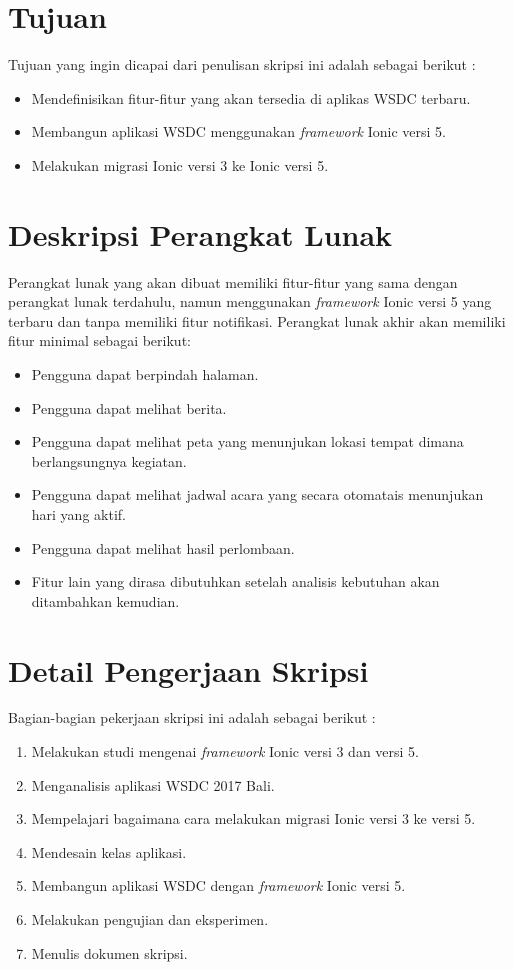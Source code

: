\documentclass[a4paper,twoside]{article}
\begin{document}
\section{Tujuan}
Tujuan yang ingin dicapai dari penulisan skripsi ini adalah sebagai berikut :
\begin{itemize}
	\item Mendefinisikan fitur-fitur yang akan tersedia di aplikas WSDC terbaru.
	\item Membangun aplikasi WSDC menggunakan {\it framework} Ionic versi 5.
	\item Melakukan migrasi Ionic versi 3 ke Ionic versi 5.
\end{itemize}

\section{Deskripsi Perangkat Lunak}
Perangkat lunak yang akan dibuat memiliki fitur-fitur yang sama dengan perangkat lunak terdahulu, namun menggunakan {\it framework} Ionic versi 5 yang terbaru dan tanpa memiliki fitur notifikasi. Perangkat lunak akhir akan memiliki fitur minimal sebagai berikut:
\begin{itemize}
	\item Pengguna dapat berpindah halaman.
	\item Pengguna dapat melihat berita.
	\item Pengguna dapat melihat peta yang menunjukan lokasi tempat dimana berlangsungnya kegiatan.
	\item Pengguna dapat melihat jadwal acara yang secara otomatais menunjukan hari yang aktif.
	\item Pengguna dapat melihat hasil perlombaan.
	\item Fitur lain yang dirasa dibutuhkan setelah analisis kebutuhan akan ditambahkan kemudian.
		
\end{itemize}

\section{Detail Pengerjaan Skripsi}
Bagian-bagian pekerjaan skripsi ini adalah sebagai berikut :
	\begin{enumerate}
		\item Melakukan studi mengenai {\it framework} Ionic versi 3 dan versi 5.
		\item Menganalisis aplikasi WSDC 2017 Bali.
		\item Mempelajari bagaimana cara melakukan migrasi Ionic versi 3 ke versi 5.
		\item Mendesain kelas aplikasi.
		\item Membangun aplikasi WSDC dengan {\it framework} Ionic versi 5. 
		\item Melakukan pengujian dan eksperimen.
		\item Menulis dokumen skripsi.
	\end{enumerate}
\end{document}
